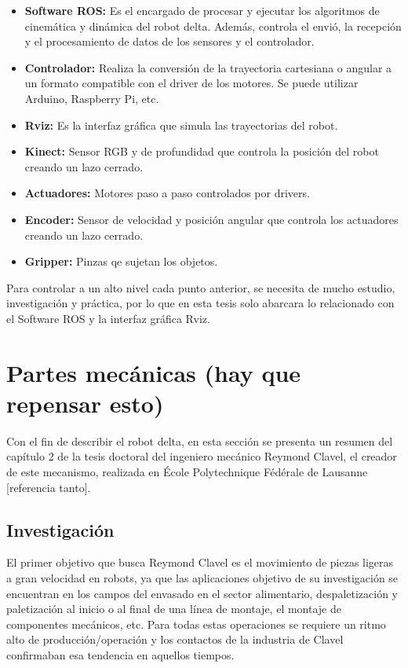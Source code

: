     \begin{itemize}
        \item \textbf{Software ROS:} Es el encargado de procesar y ejecutar los algoritmos de cinemática y dinámica del robot delta. Además, controla el envió, la recepción y el procesamiento de datos de los sensores y el controlador.
        \item \textbf{Controlador:} Realiza la conversión de la trayectoria cartesiana o angular a un formato compatible con el driver de los motores. Se puede utilizar Arduino, Raspberry Pi, etc.
        \item \textbf{Rviz:} Es la interfaz gráfica que simula las trayectorias del robot.
        \item \textbf{Kinect:} Sensor RGB y de profundidad que controla la posición del robot creando un lazo cerrado.
        \item \textbf{Actuadores:} Motores paso a paso controlados por drivers.
        \item \textbf{Encoder:} Sensor de velocidad y posición angular que controla los actuadores creando un lazo cerrado.
        \item \textbf{Gripper:} Pinzas qe sujetan los objetos.
    \end{itemize}
    
    Para controlar a un alto nivel cada punto anterior, se necesita de mucho estudio, investigación y práctica, por lo que en esta tesis solo abarcara lo relacionado con el Software ROS y la interfaz gráfica Rviz.  
    
    \newpage

    
\section{Partes mecánicas (hay que repensar esto)}
    Con el fin de describir el robot delta, en esta sección se presenta un resumen del capítulo 2 de la tesis doctoral del ingeniero mecánico Reymond Clavel, el creador de este mecanismo, realizada en École Polytechnique Fédérale de Lausanne [referencia tanto]. 

    
    \subsection{Investigación}
    El primer objetivo que busca Reymond Clavel es el movimiento de piezas ligeras a gran velocidad en robots, ya que las aplicaciones objetivo de su investigación se encuentran en los campos del envasado en el sector alimentario, despaletización y paletización al inicio o al final de una línea de montaje, el montaje de componentes mecánicos, etc. Para todas estas operaciones se requiere un ritmo alto de producción/operación y los contactos de la industria de Clavel confirmaban esa tendencia en aquellos tiempos.
    
